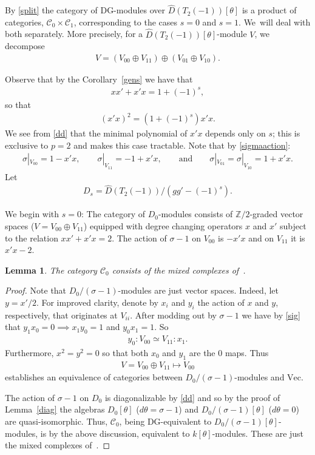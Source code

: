 \documentclass[pdftex]{sigma}
\numberwithin{equation}{section}
\newtheorem{Lemma}[Theorem]{Lemma}
\newcommand{\Cc}{\mathcal{C}}
\newcommand{\vect}{\text{Vec}}
\begin{document}
By \eqref{split} the category of DG-modules over $\widehat{D}(T_2(-1))[\theta]$ is a product of categories, $\Cc_0\times \Cc_1$, corresponding to the cases $s=0$ and $s=1$. We~will deal with both separately. More precisely, for a $\widehat{D}(T_2(-1))[\theta]$-module $V$, we decompose
\begin{gather}
V=(V_{00}\oplus V_{11})\oplus(V_{01}\oplus V_{10}).
\end{gather}

Observe that by the Corollary~\ref{gens} we have that
\begin{gather}
xx'+x'x=1+(-1)^s,
\end{gather}
so that
\begin{gather}\label{dd}
(x'x)^2=(1+(-1)^s)x'x.
\end{gather}
We see from \eqref{dd} that the minimal polynomial of $x'x$ depends only on $s$; this is exclusive to $p=2$ and makes this case tractable. Note that by \eqref{sigmaaction}:
\begin{gather}\label{sig}
\sigma|_{V_{00}}=1-x'x,\qquad \sigma|_{V_{11}}=-1+x'x,\qquad\text{and}\qquad \sigma|_{V_{01}}=\sigma|_{V_{10}}=1+x'x.
\end{gather} Let
\begin{gather}
D_s=\widehat{D}(T_2(-1))/(gg'-(-1)^s).
\end{gather}

We begin with $s=0$: The category of $D_0$-modules consists of $\mathbb{Z}/2$-graded vector spaces ($V=V_{00}\oplus V_{11}$) equipped with degree changing operators $x$ and $x'$ subject to the relation $xx'+x'x=2$. The action of $\sigma-1$ on $V_{00}$ is $-x'x$ and on $V_{11}$ it is $x'x-2$.

\begin{Lemma}
The category $\Cc_0$ consists of the mixed complexes of~{\rm \cite{kassel}}.
\end{Lemma}

 \begin{proof}
Note that $D_0/(\sigma-1)$-modules are just vector spaces. Indeed, let $y=x'/2$. For improved clarity, denote by $x_i$ and $y_i$ the action of $x$ and $y$, respectively, that originates at $V_{ii}$. After modding out by $\sigma-1$ we have by \eqref{sig} that $y_1x_0=0\implies x_1y_0=1$ and $y_0x_1=1$. So
\begin{gather}
y_0:V_{00}\simeq V_{11}: x_1.
\end{gather}
Furthermore, $x^2=y^2=0$ so that both $x_0$ and $y_1$ are the $0$ maps. Thus
\begin{gather}
V=V_{00}\oplus V_{11}\mapsto V_{00}
\end{gather}
establishes an equivalence of categories between $D_0/(\sigma-1)$-modules and $\vect$.

The action of $\sigma-1$ on $D_0$ is diagonalizable by \eqref{dd} and so by the proof of Lemma~\ref{diag} the algebras $D_0[\theta]$ ($d\theta=\sigma-1$) and $D_0/(\sigma-1)[\theta]$ ($d\theta=0$) are quasi-isomorphic. Thus, $\Cc_0$, being DG-equivalent to $D_0/(\sigma-1)[\theta]$-modules, is by the above discussion, equivalent to $k[\theta]$-modules. These are just the mixed complexes of~\cite{kassel}.
\end{proof}
\end{document}
